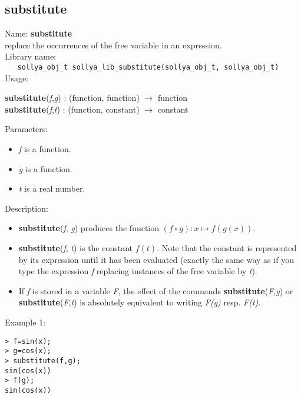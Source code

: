 \subsection{substitute}
\label{labsubstitute}
\noindent Name: \textbf{substitute}\\
\phantom{aaa}replace the occurrences of the free variable in an expression.\\[0.2cm]
\noindent Library name:\\
\verb|   sollya_obj_t sollya_lib_substitute(sollya_obj_t, sollya_obj_t)|\\[0.2cm]
\noindent Usage: 
\begin{center}
\textbf{substitute}(\emph{f},\emph{g}) : (\textsf{function}, \textsf{function}) $\rightarrow$ \textsf{function}\\
\textbf{substitute}(\emph{f},\emph{t}) : (\textsf{function}, \textsf{constant}) $\rightarrow$ \textsf{constant}\\
\end{center}
Parameters: 
\begin{itemize}
\item \emph{f} is a function.
\item \emph{g} is a function.
\item \emph{t} is a real number.
\end{itemize}
\noindent Description: \begin{itemize}

\item \textbf{substitute}(\emph{f}, \emph{g}) produces the function $(f \circ g) : x \mapsto f(g(x))$.

\item \textbf{substitute}(\emph{f}, \emph{t}) is the constant $f(t)$. Note that the constant is
   represented by its expression until it has been evaluated (exactly the same
   way as if you type the expression \emph{f} replacing instances of the free variable 
   by \emph{t}).

\item If \emph{f} is stored in a variable \emph{F}, the effect of the commands \textbf{substitute}(\emph{F},\emph{g}) or \textbf{substitute}(\emph{F},\emph{t}) is absolutely equivalent to 
   writing \emph{F(g)} resp. \emph{F(t)}.
\end{itemize}
\noindent Example 1: 
\begin{center}\begin{minipage}{15cm}\begin{Verbatim}[frame=single,commandchars=\\\|\~]
> f=sin(x);
> g=cos(x);
> substitute(f,g);
sin(cos(x))
> f(g);
sin(cos(x))
\end{Verbatim}
\end{minipage}\end{center}
